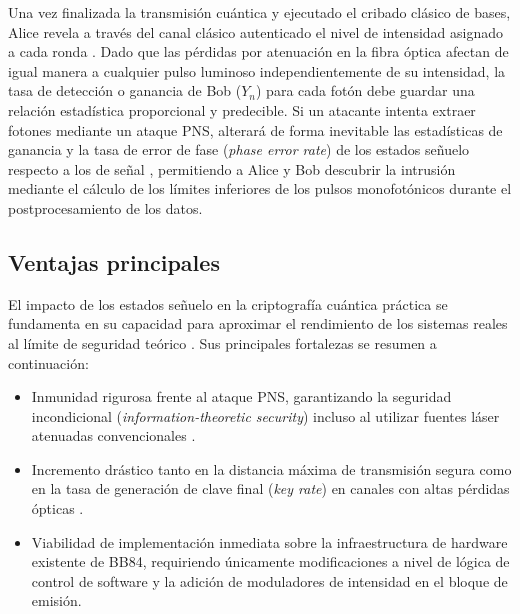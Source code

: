 Una vez finalizada la transmisión cuántica y ejecutado el cribado clásico de bases, Alice revela a través del canal clásico autenticado el nivel de intensidad asignado a cada ronda \citep{lo2005}. Dado que las pérdidas por atenuación en la fibra óptica afectan de igual manera a cualquier pulso luminoso independientemente de su intensidad, la tasa de detección o ganancia de Bob ($Y_n$) para cada fotón debe guardar una relación estadística proporcional y predecible. Si un atacante intenta extraer fotones mediante un ataque PNS, alterará de forma inevitable las estadísticas de ganancia y la tasa de error de fase (\emph{phase error rate}) de los estados señuelo respecto a los de señal \citep{wang2005}, permitiendo a Alice y Bob descubrir la intrusión mediante el cálculo de los límites inferiores de los pulsos monofotónicos durante el postprocesamiento de los datos.

\subsection{Ventajas principales}
El impacto de los estados señuelo en la criptografía cuántica práctica se fundamenta en su capacidad para aproximar el rendimiento de los sistemas reales al límite de seguridad teórico \citep{scarani2009, lo2014}. Sus principales fortalezas se resumen a continuación:
\begin{itemize}
    \item Inmunidad rigurosa frente al ataque PNS, garantizando la seguridad incondicional (\emph{information-theoretic security}) incluso al utilizar fuentes láser atenuadas convencionales \citep{lo2005, wang2005}.
    \item Incremento drástico tanto en la distancia máxima de transmisión segura como en la tasa de generación de clave final (\emph{key rate}) en canales con altas pérdidas ópticas \citep{scarani2004}.
    \item Viabilidad de implementación inmediata sobre la infraestructura de hardware existente de BB84, requiriendo únicamente modificaciones a nivel de lógica de control de software y la adición de moduladores de intensidad en el bloque de emisión.
\end{itemize}

